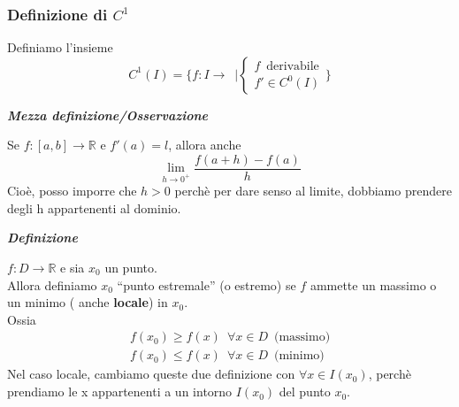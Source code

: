 \documentclass{article}
\theoremstyle{definition}
\newcommand{\virgolette}[1]{``#1''}
\begin{document}
\subsubsection{Definizione di $C^1$}
Definiamo l'insieme
\begin{equation}
    C^1(I)=\{f: I \to \,\,\, | \mbox{$\begin{cases}
        f \,\,\, \mbox{derivabile} \\
        f' \in C^0(I)
    \end{cases}$}\}
\end{equation}
\begin{center}
    \textbf{\textit{Mezza definizione/Osservazione}}
\end{center}
Se $f: [a,b] \to \mathbb{R}$ e $f'(a)=l$, allora anche
\begin{equation*}
    \lim_{h \to 0^+}\frac{f(a+h)-f(a)}{h}
\end{equation*}
Cioè, posso imporre che $h >0$ perchè per dare senso al limite, dobbiamo prendere degli h appartenenti al dominio.
\\
\begin{center}
    \textbf{\textit{Definizione}}
\end{center}
$f: D \to \mathbb{R}$ e sia $x_0$ un punto.
\\
Allora definiamo $x_0$ \virgolette{punto estremale} (o estremo) se $f$ ammette un massimo o un minimo ( anche \textbf{locale}) in $x_0$.
\\
Ossia
\begin{gather*}
    f(x_0) \geqslant f(x) \,\,\, \forall x \in D \,\,\,\mbox{(massimo)}\\
    f(x_0) \leqslant f(x) \,\,\, \forall x \in D \,\,\, \mbox{(minimo)}
\end{gather*}
Nel caso locale, cambiamo queste due definizione con $\forall x \in I(x_0)$, perchè prendiamo le x appartenenti a un intorno $I(x_0)$ del punto $x_0$.
\end{document}
